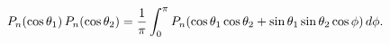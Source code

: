 \[\mathop{P_{n}\/}\nolimits\!\left(\mathop{\cos\/}\nolimits\theta_{1}\right)%
\mathop{P_{n}\/}\nolimits\!\left(\mathop{\cos\/}\nolimits\theta_{2}\right)=%
\frac{1}{\pi}\int_{0}^{\pi}\mathop{P_{n}\/}\nolimits\!\left(\mathop{\cos\/}%
\nolimits\theta_{1}\mathop{\cos\/}\nolimits\theta_{2}+\mathop{\sin\/}\nolimits%
\theta_{1}\mathop{\sin\/}\nolimits\theta_{2}\mathop{\cos\/}\nolimits\phi\right%
)d\phi.\]
